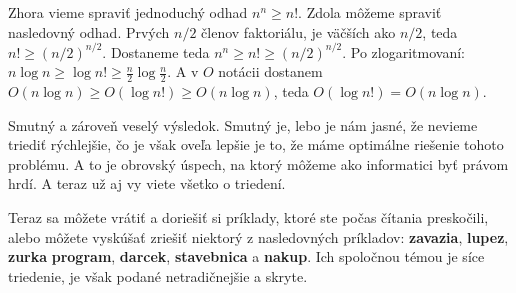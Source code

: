 Zhora vieme spraviť jednoduchý odhad $n^n \geq n!$. Zdola môžeme spraviť nasledovný odhad. Prvých
$n/2$ členov faktoriálu, je väčších ako $n/2$, teda $n! \geq (n/2)^{n/2}$.
Dostaneme teda $n^n \geq n! \geq (n/2)^{n/2}$. 
Po zlogaritmovaní: $n\log n \geq \log n! \geq \frac{n}{2} \log \frac{n}{2}$. A v $O$ notácii
dostanem $O(n\log n) \geq O(\log n!) \geq O(n\log n)$, teda $O(\log n!) = O(n \log n)$.

Smutný a zároveň veselý výsledok. Smutný je, lebo je nám jasné, že nevieme triediť rýchlejšie, čo je
však oveľa lepšie je to, že máme optimálne riešenie tohoto problému. A to je obrovský úspech, na
ktorý môžeme ako informatici byť právom hrdí. A teraz už aj vy viete všetko o triedení.

\medskip

Teraz sa môžete vrátiť a doriešiť si príklady, ktoré ste počas čítania preskočili, alebo môžete
vyskúšať zriešiť niektorý z nasledovných príkladov: \textbf{zavazia}, \textbf{lupez}, \textbf{zurka}
\textbf{program}, \textbf{darcek}, \textbf{stavebnica} a \textbf{nakup}.
Ich spoločnou témou je síce triedenie, je však podané netradičnejšie a skryte.



